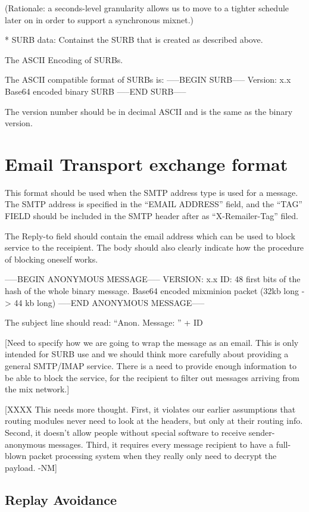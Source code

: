   (Rationale: a seconds-level granularity allows us to move to a
  tighter schedule later on in order to support a synchronous mixnet.)

* SURB data: Containst the SURB that is created as described
  above. 

The ASCII Encoding of SURBs.

The  ASCII compatible format of SURBs is:
-----BEGIN SURB-----
Version: x.x
Base64 encoded binary SURB 
-----END SURB-----

The version number should be in decimal ASCII and is the same as the
binary version.

\section{Email Transport exchange format}

This format should be used when the SMTP address type is used for a
message. The SMTP address is specified in the ``EMAIL ADDRESS'' field,
and the ``TAG'' FIELD should be included in the SMTP header after as
``X-Remailer-Tag'' filed.

The Reply-to field should contain the email address which can be used
to block service to the receipient. The body should also clearly
indicate how the procedure of blocking oneself works.

-----BEGIN ANONYMOUS MESSAGE-----
VERSION: x.x
ID: 48 first bits of the hash of the whole binary message.
Base64 encoded mixminion packet (32kb long -> 44 kb long)
-----END ANONYMOUS MESSAGE-----

The subject line should read: ``Anon. Message: '' + ID

[Need to specify how we are going to wrap the message
 as an email. This is only intended for SURB use and
 we should think more carefully about providing a 
 general SMTP/IMAP service.
 There is a need to provide enough information to be 
 able to block the service, for the recipient to
 filter out messages arriving from the mix network.]

[XXXX This needs more thought.  First, it violates our earlier
      assumptions that routing modules never need to look at the
      headers, but only at their routing info.  Second, it doesn't
      allow people without special software to receive
      sender-anonymous messages.  Third, it requires every message
      recipient to have a full-blown packet processing system when
      they really only need to decrypt the payload.  -NM]

\subsection{Replay Avoidance}

